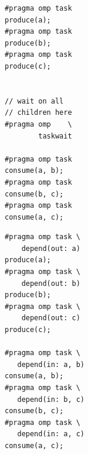 \begin{figure}

\newsavebox{\firstExample}
\newsavebox{\secondExample}

\begin{lrbox}{\firstExample}
\begin{minipage}{0.45\columnwidth}
\begin{verbatim}
#pragma omp task
produce(a);
#pragma omp task
produce(b);
#pragma omp task
produce(c);


// wait on all
// children here
#pragma omp    \
        taskwait

#pragma omp task
consume(a, b);
#pragma omp task
consume(b, c);
#pragma omp task
consume(a, c);
\end{verbatim}
\end{minipage}
\end{lrbox}

\begin{lrbox}{\secondExample}
\begin{minipage}{0.50\columnwidth}
\begin{verbatim}
#pragma omp task \
    depend(out: a)
produce(a);
#pragma omp task \
    depend(out: b)
produce(b);
#pragma omp task \
    depend(out: c)
produce(c);

#pragma omp task \
   depend(in: a, b)
consume(a, b);
#pragma omp task \
   depend(in: b, c)
consume(b, c);
#pragma omp task \
   depend(in: a, c)
consume(a, c);
\end{verbatim}
\end{minipage}
\end{lrbox}



\subfloat[][OpenMP 3.0]{\usebox{\firstExample}\label{fig:CodeTaskDeps3.0code}}
~
~
\subfloat[][OpenMP 4.0]{\usebox{\secondExample}\label{fig:CodeTaskDeps4.0code}}

\addtocounter{subfigure}{-1}


\end{figure}
